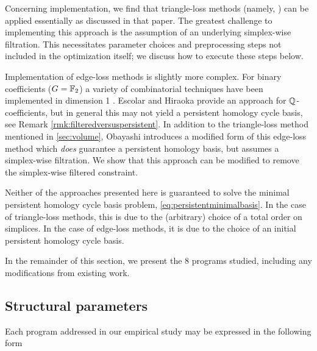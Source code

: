 Concerning implementation, we find that triangle-loss methods (namely, \cite{Obayashi2018}) can be applied essentially as discussed in that paper.  The greatest challenge to implementing this approach is the assumption of an underlying simplex-wise filtration. This necessitates parameter choices and preprocessing steps not included in the optimization itself; we discuss how to execute these steps below.  
 
Implementation of edge-loss methods is slightly more complex.  For binary coefficients ($G = \mathbb{F}_2$) a variety of combinatorial techniques have been implemented in dimension 1 \cite{chenquantifying, zhang2019heuristic}.  Escolar and Hiraoka \cite{Escolar2016} provide an approach for $\mathbb{Q}$-coefficients, but in general this may not yield a persistent homology cycle basis, see Remark \ref{rmk:filteredversuspersistent}.   
In addition to the triangle-loss method mentioned in \se \ref{sec:volume}, Obayashi \cite{Obayashi2018} introduces a modified form of this edge-loss method which \emph{does} guarantee a persistent homology basis, but assumes a simplex-wise filtration.  We show that this approach can be modified to remove the simplex-wise filtered constraint.

Neither of the approaches presented here is guaranteed to solve the minimal persistent homology cycle basis problem, \eq \eqref{eq:persistentminimalbasis}.  In the case of triangle-loss methods, this is due to the (arbitrary) choice of a total order on simplices.  In the case of edge-loss methods, it is due to the choice of an initial persistent homology cycle basis.  

In the remainder of this section, we present the 8 programs studied, including any modifications from existing work.

\subsection{Structural parameters}
\label{sec_structuralparams}

Each program addressed in our empirical study may be expressed in the following form
 
